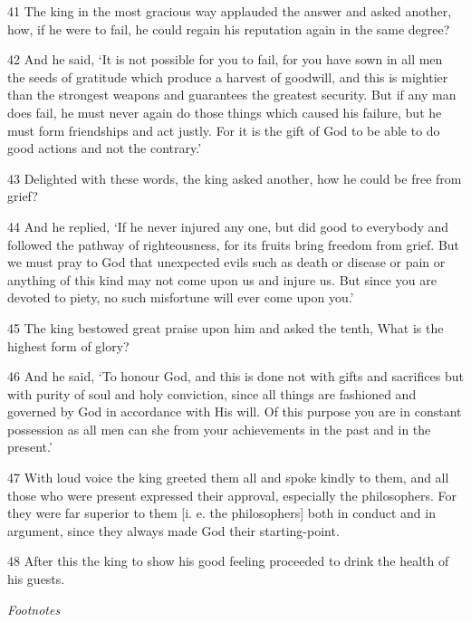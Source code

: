 \par 41 The king in the most gracious way applauded the answer and asked another, how, if he were to fail, he could regain his reputation again in the same degree?

\par 42 And he said, ‘It is not possible for you to fail, for you have sown in all men the seeds of gratitude which produce a harvest of goodwill, and this is mightier than the strongest weapons and guarantees the greatest security. But if any man does fail, he must never again do those things which caused his failure, but he must form friendships and act justly. For it is the gift of God to be able to do good actions and not the contrary.’

\par 43 Delighted with these words, the king asked another, how he could be free from grief?

\par 44 And he replied, ‘If he never injured any one, but did good to everybody and followed the pathway of righteousness, for its fruits bring freedom from grief. But we must pray to God that unexpected evils such as death or disease or pain or anything of this kind may not come upon us and injure us. But since you are devoted to piety, no such misfortune will ever come upon you.’

\par 45 The king bestowed great praise upon him and asked the tenth, What is the highest form of glory?

\par 46 And he said, ‘To honour God, and this is done not with gifts and sacrifices but with purity of soul and holy conviction, since all things are fashioned and governed by God in accordance with His will. Of this purpose you are in constant possession as all men can she from your achievements in the past and in the present.’

\par 47 With loud voice the king greeted them all and spoke kindly to them, and all those who were present expressed their approval, especially the philosophers. For they were far superior to them [i. e. the philosophers] both in conduct and in argument, since they always made God their starting-point.

\par 48 After this the king to show his good feeling proceeded to drink the health of his guests.

\par \textit{Footnotes}

